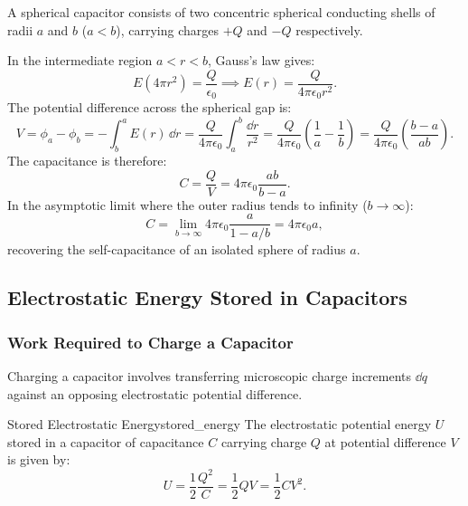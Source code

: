 \begin{example}
    A spherical capacitor consists of two concentric spherical conducting shells of radii \(a\) and \(b\) (\(a < b\)), carrying charges \(+Q\) and \(-Q\) respectively.
    
    In the intermediate region \(a < r < b\), Gauss's law gives:
    \begin{equation}
        E(4\pi r^2) = \frac{Q}{\epsilon_0} \implies E(r) = \frac{Q}{4\pi\epsilon_0 r^2}.
    \end{equation}
    The potential difference across the spherical gap is:
    \begin{equation}
        V = \phi_a - \phi_b = -\int_b^a E(r)\,\dd r = \frac{Q}{4\pi\epsilon_0}\int_a^b \frac{\dd r}{r^2} = \frac{Q}{4\pi\epsilon_0}\left(\frac{1}{a} - \frac{1}{b}\right) = \frac{Q}{4\pi\epsilon_0}\left(\frac{b - a}{ab}\right).
    \end{equation}
    The capacitance is therefore:
    \begin{equation}
        C = \frac{Q}{V} = 4\pi\epsilon_0 \frac{ab}{b - a}.
    \end{equation}
    In the asymptotic limit where the outer radius tends to infinity (\(b \to \infty\)):
    \begin{equation}
        C = \lim_{b\to\infty} 4\pi\epsilon_0 \frac{a}{1 - a/b} = 4\pi\epsilon_0 a,
    \end{equation}
    recovering the self-capacitance of an isolated sphere of radius \(a\).
\end{example}

\subsection{Electrostatic Energy Stored in Capacitors}

\subsubsection{Work Required to Charge a Capacitor}

Charging a capacitor involves transferring microscopic charge increments \(\dd q\) against an opposing electrostatic potential difference.

\begin{proposition}{Stored Electrostatic Energy}{stored_energy}
    The electrostatic potential energy \(U\) stored in a capacitor of capacitance \(C\) carrying charge \(Q\) at potential difference \(V\) is given by:
    \begin{equation}
        U = \frac{1}{2}\frac{Q^2}{C} = \frac{1}{2}QV = \frac{1}{2}CV^2.
    \end{equation}
\end{proposition}


